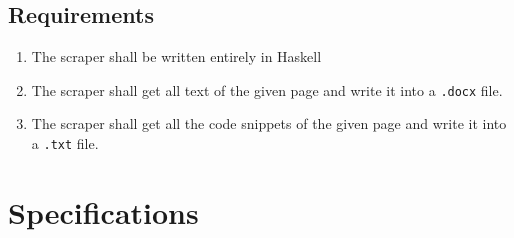\documentclass{scrreprt}
\begin{document}
\section{Requirements}

\begin{enumerate}
    \item The scraper shall be written entirely in Haskell
    \item The scraper shall get all text of the given page and write it into a \texttt{.docx} file.
    \item The scraper shall get all the code snippets of the given page and write it into a \texttt{.txt} file.
\end{enumerate}



    
        



\chapter{Specifications}
\end{document}
